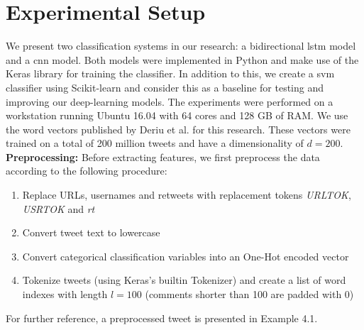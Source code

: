\documentclass[11pt]{article}
\begin{document}
\section{Experimental Setup}
We present two classification systems in our research: a bidirectional \ac{lstm} model and a \ac{cnn} model. Both models were implemented in Python and make use of the Keras library \cite{RN64} for training the classifier. In addition to this, we create a \ac{svm} classifier using Scikit-learn \cite{scikit-learn} and consider this as a baseline for testing and improving our deep-learning models. The experiments were performed on a workstation running Ubuntu 16.04 with 64 cores and 128 GB of RAM.
\newline
We use the word vectors published by Deriu et al.  for this research. These vectors were trained on a total of 200 million tweets and have a dimensionality of $d=200$.
\newline
\textbf{Preprocessing: }
Before extracting features, we first preprocess the data according to the following procedure:
\begin{enumerate}[topsep=1.5pt,itemsep=-1ex,partopsep=1ex,parsep=1ex] 
  \item Replace URLs, usernames and retweets with replacement tokens \textit{URLTOK}, \textit{USRTOK} and \textit{rt}
  \item Convert tweet text to lowercase
  \item Convert categorical classification variables into an One-Hot encoded vector
  \item Tokenize tweets (using Keras's builtin Tokenizer) and create a list of word indexes with length $l=100$ (comments shorter than 100 are padded with 0)
\end{enumerate}
For further reference, a preprocessed tweet is presented in Example 4.1.
\newline
\noindent{}
\end{document}
